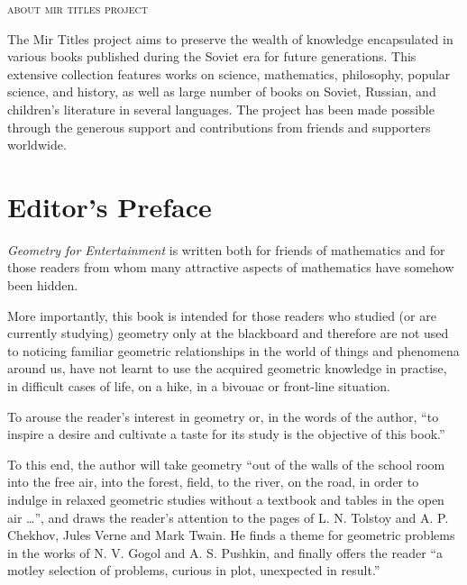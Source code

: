 \cleardoublepage
\thispagestyle{empty}
\vspace*{\fill}
\begin{center}
\textsc{\large about mir titles project}
\end{center}
The Mir Titles project aims to preserve the wealth of knowledge encapsulated in various books published during the Soviet era for future generations. This extensive collection features works on science, mathematics, philosophy, popular science, and history, as well as large number of books on Soviet, Russian, and children's literature in several languages. The project has been made possible through the generous support and contributions from friends and supporters worldwide.






 
 \cleardoublepage

\chapter{Editor's Preface}
\label{editor-preface}


\emph{Geometry for Entertainment} is written both for friends of mathematics and for those readers from whom many attractive aspects of mathematics have somehow been hidden.

More importantly, this book is intended for those readers who studied (or are currently studying) geometry only at the blackboard and therefore are not used to noticing familiar geometric relationships in the world of things and phenomena around us, have not learnt to use the acquired geometric knowledge in practise, in difficult cases of life, on a hike, in a bivouac or front-line situation.

To arouse the reader's interest in geometry or, in the words of the author, ``to inspire a desire and cultivate a taste for its study is the objective of this book.''

To this end, the author will take geometry ``out of the walls of the school room into the free air, into the forest, field, to the river, on the road, in order to indulge in relaxed geometric studies without a textbook and tables in the open air \ldots{}'', and draws the reader's attention to the pages of L. N. Tolstoy and A. P. Chekhov, Jules Verne and Mark Twain. He finds a theme for geometric problems in the works of N. V. Gogol and A. S. Pushkin, and finally offers the reader ``a motley selection of problems, curious in plot, unexpected in result.''

